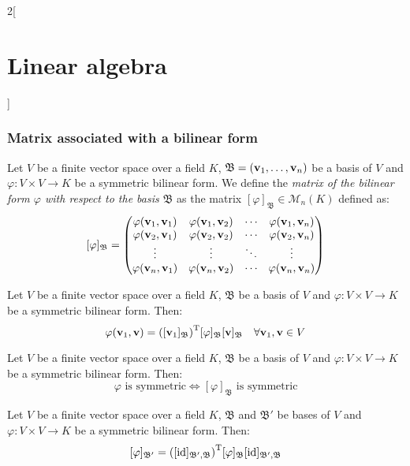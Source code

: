 \documentclass[../../../main.tex]{subfiles}
\begin{document}
\begin{multicols}{2}[\section{Linear algebra}]
    \subsubsection*{Matrix associated with a bilinear form}
    \begin{definition}
        Let $V$ be a finite vector space over a field $K$, $\mathfrak{B}=(\boldsymbol{\mathrm{v}}_1,\ldots,\boldsymbol{\mathrm{v}}_n)$ be a basis of $V$ and $\varphi:V\times V\rightarrow K$ be a symmetric bilinear form. We define the \textit{matrix of the bilinear form $\varphi$ with respect to the basis $\mathfrak{B}$} as the matrix $[\varphi]_\mathfrak{B}\in\mathcal{M}_n(K)$ defined as: $$[\varphi]_\mathfrak{B}=
            \begin{pmatrix}
                \varphi(\boldsymbol{\mathrm{v}}_1,\boldsymbol{\mathrm{v}}_1) & \varphi(\boldsymbol{\mathrm{v}}_1,\boldsymbol{\mathrm{v}}_2) & \cdots & \varphi(\boldsymbol{\mathrm{v}}_1,\boldsymbol{\mathrm{v}}_n) \\
                \varphi(\boldsymbol{\mathrm{v}}_2,\boldsymbol{\mathrm{v}}_1) & \varphi(\boldsymbol{\mathrm{v}}_2,\boldsymbol{\mathrm{v}}_2) & \cdots & \varphi(\boldsymbol{\mathrm{v}}_2,\boldsymbol{\mathrm{v}}_n) \\
                \vdots                                             & \vdots                                             & \ddots & \vdots                                             \\
                \varphi(\boldsymbol{\mathrm{v}}_n,\boldsymbol{\mathrm{v}}_1) & \varphi(\boldsymbol{\mathrm{v}}_n,\boldsymbol{\mathrm{v}}_2) & \cdots & \varphi(\boldsymbol{\mathrm{v}}_n,\boldsymbol{\mathrm{v}}_n) \\
            \end{pmatrix}$$
    \end{definition}
    \begin{lemma}
        Let $V$ be a finite vector space over a field $K$, $\mathfrak{B}$ be a basis of $V$ and $\varphi:V\times V\rightarrow K$ be a symmetric bilinear form. Then:
        $$\varphi(\boldsymbol{\mathrm{v}}_1,\boldsymbol{\mathrm{v}})={\left([\boldsymbol{\mathrm{v}}_1]_\mathfrak{B}\right)}^\mathrm{T}[\varphi]_\mathfrak{B}[\boldsymbol{\mathrm{v}}]_\mathfrak{B}\quad\forall\boldsymbol{\mathrm{v}}_1,\boldsymbol{\mathrm{v}}\in V$$
    \end{lemma}
    \begin{prop}
        Let $V$ be a finite vector space over a field $K$, $\mathfrak{B}$ be a basis of $V$ and $\varphi:V\times V\rightarrow K$ be a symmetric bilinear form. Then: $$\varphi\text{ is symmetric}\iff[\varphi]_\mathfrak{B}\text{ is symmetric}$$
    \end{prop}
    \begin{prop}
        Let $V$ be a finite vector space over a field $K$, $\mathfrak{B}$ and $\mathfrak{B}'$ be bases of $V$ and $\varphi:V\times V\rightarrow K$ be a symmetric bilinear form. Then: $$[\varphi]_{\mathfrak{B}'}={([\mathrm{id}]_{\mathfrak{B}',\mathfrak{B}})}^\mathrm{T}[\varphi]_\mathfrak{B}[\mathrm{id}]_{\mathfrak{B}',\mathfrak{B}}$$
    \end{prop}

\end{multicols}
\end{document}
